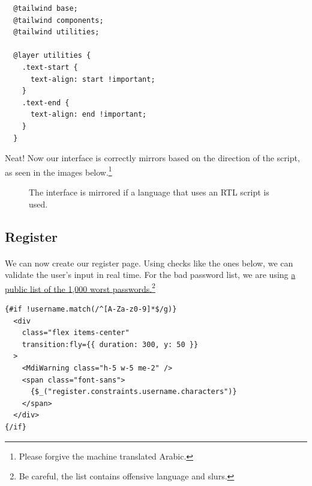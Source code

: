 \documentclass{report}
\begin{document}
\begin{verbatim}
  @tailwind base;
  @tailwind components;
  @tailwind utilities;
  
  @layer utilities {
    .text-start {
      text-align: start !important;
    }
    .text-end {
      text-align: end !important;
    }
  }  
\end{verbatim}
Neat! Now our interface is correctly mirrors based on the direction of the script, as seen in the images below.\footnote{Please forgive the machine translated Arabic.}
\begin{figure}[H]
  \centering
  \label{fig:localisation2}
  \caption{The interface is mirrored if a language that uses an RTL script is used.}
\end{figure}

\subsection{Register}
\paragraph{}
We can now create our register page. Using checks like the ones below, we can validate the user's input in real time. For the bad password list, we are using \href{https://github.com/danielmiessler/SecLists/blob/master/Passwords/Common-Credentials/10-million-password-list-top-1000.txt}{a public list of the 1,000 worst passwords.}\footnote{Be careful, the list contains offensive language and slurs.}
\begin{verbatim}
{#if !username.match(/^[A-Za-z0-9]*$/g)}
  <div
    class="flex items-center"
    transition:fly={{ duration: 300, y: 50 }}
  >
    <MdiWarning class="h-5 w-5 me-2" />
    <span class="font-sans">
      {$_("register.constraints.username.characters")} 
    </span>
  </div>
{/if}
\end{verbatim}
\end{document}
